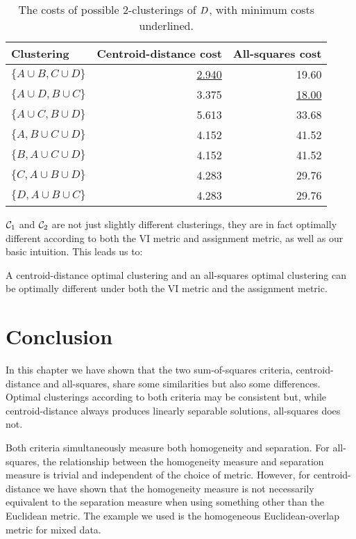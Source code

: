 \begin{table}
  \centering
  \caption{The costs of possible 2-clusterings
    of $D$, with minimum costs underlined.}
  \begin{tabular}{lrr}
  \toprule
  Clustering & Centroid-distance cost & All-squares cost \\
  \midrule
  $\{A \cup B, C \cup D\}$ & \underline{2.940} & 19.60 \\
  $\{A \cup D, B \cup C\}$ & 3.375 & \underline{18.00} \\
  $\{A \cup C, B \cup D\}$ & 5.613 & 33.68 \\
  $\{A, B \cup C \cup D\}$ & 4.152 & 41.52 \\
  $\{B, A \cup C \cup D\}$ & 4.152 & 41.52 \\
  $\{C, A \cup B \cup D\}$ & 4.283 & 29.76 \\
  $\{D, A \cup B \cup C\}$ & 4.283 & 29.76 \\
  \bottomrule
\end{tabular}
\label{tab:costs}
\end{table}


$\mathcal{C}_1$ and $\mathcal{C}_2$ are not just slightly different clusterings, they are
in fact optimally different according to both the VI metric and assignment
metric, as well as our basic intuition.  This leads us to:
\begin{thm}
  \label{thm:worst-case}
  A centroid-distance optimal clustering and an all-squares optimal clustering
  can be optimally different under both the VI metric and the assignment
  metric.
\end{thm}

\section{Conclusion}
\label{sec:conclusion}

In this chapter we have shown that the two sum-of-squares criteria,
centroid-distance and all-squares, share some similarities but also some
differences.  Optimal clusterings according to both criteria may be consistent
but, while centroid-distance always produces linearly separable solutions,
all-squares does not.

Both criteria simultaneously measure both homogeneity and separation.  For
all-squares, the relationship between the homogeneity measure and separation
measure is trivial and independent of the choice of metric.  However, for
centroid-distance we have shown that the homogeneity measure is not
necessarily equivalent to the separation measure when using something other
than the Euclidean metric.  The example we used is the homogeneous
Euclidean-overlap metric for mixed data.

